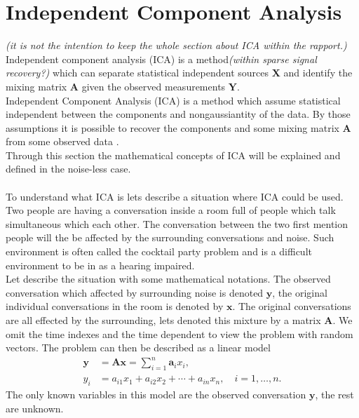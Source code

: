 \section{Independent Component Analysis}\label{sec:ICA}
\textit{(it is not the intention to keep the whole section about ICA within the rapport.)}
Independent component analysis (ICA) is a method\textit{(within sparse signal recovery?)} which can separate statistical independent sources $\textbf{X}$ and identify the mixing matrix $\textbf{A}$ given the observed measurements $\textbf{Y}$. \\
Independent Component Analysis (ICA) is a method which assume statistical independent between the components and nongaussiantity of the data. By those assumptions it is possible to recover the components and some mixing matrix $\mathbf{A}$ from some observed data \cite[p. 3]{ICA}. 
\\
Through this section the mathematical concepts of ICA will be explained and defined in the noise-less case.
\\ \\
To understand what ICA is lets describe a situation where ICA could be used. Two people are having a conversation inside a room full of people which talk simultaneous which each other. The conversation between the two first mention people will the be affected by the surrounding conversations and noise. Such environment is often called the cocktail party problem and is a difficult environment to be in as a hearing impaired.
\\
Let describe the situation with some mathematical notations. The observed conversation which affected by surrounding noise is denoted $\mathbf{y}$, the original individual conversations in the room is denoted by $\mathbf{x}$. The original conversations are all effected by the surrounding, lets denoted this mixture by a matrix $\mathbf{A}$. We omit the time indexes and the time dependent to view the problem with random vectors. The problem can then be described as a linear model
\begin{align}
\mathbf{y} &= \mathbf{Ax} = \sum_{i=1}^n \mathbf{a}_i x_i,  \label{eq:ICA_1} \\
y_i &= a_{i1} x_1 + a_{i2} x_2 + \cdots + a_{in} x_n, \quad i = 1, \dots, n. \label{eq:ICA_2}
\end{align}
The only known variables in this model are the observed conversation $\mathbf{y}$, the rest are unknown. 
\\ \\
